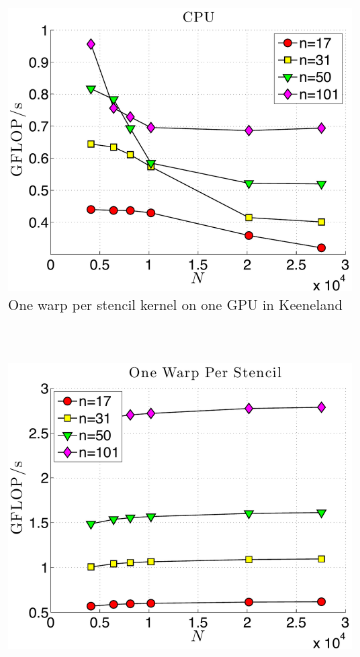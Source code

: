 \begin{figure}
\centering
\begin{subfigure}[t]{0.425\textwidth}
\includegraphics[width=\textwidth]{../figures/keeneland_results/alltoallv_cosine/gflops_cpu_1proc_oneWarpPerStencil.pdf}
\caption{One warp per stencil kernel on one GPU in Keeneland}
\label{fig:gflops_cpu_1proc_keeneland}
\end{subfigure} \\
\begin{subfigure}[t]{0.425\textwidth}
\includegraphics[width=\textwidth]{../figures/keeneland_results/alltoallv_cosine/gflops_gpu_1proc_oneWarpPerStencil.pdf}

\end{subfigure}
\end{figure}
